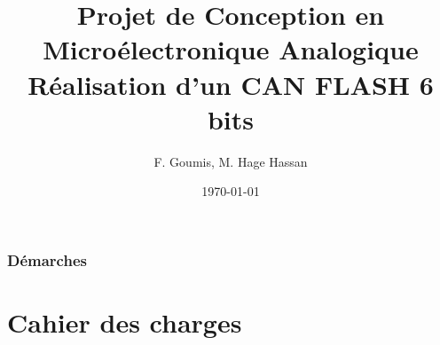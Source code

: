 \documentclass{beamer}
\title[Projet Micro\'electronique 2A SEI]{Projet de Conception en Micro\'electronique Analogique \\ R\'ealisation d'un CAN FLASH 6 bits }
\author{F. Goumis, M. Hage Hassan} %
\institute[Phelma] %
{
Institut Polytechnique de Grenoble - Phelma\\ %
\medskip
\textit{mohamed.hage-hassan@phelma.grenoble-inp.fr}\\ %
\textit{ferdinand.goumis@phelma.grenoble-inp.fr}
}
\date{\today} %
\begin{document}
\begin{frame}
\titlepage %
\end{frame}


\begin{frame}
\frametitle{D\'emarches}

\tableofcontents

\end{frame}

\section{Cahier des charges} %

\end{document}
